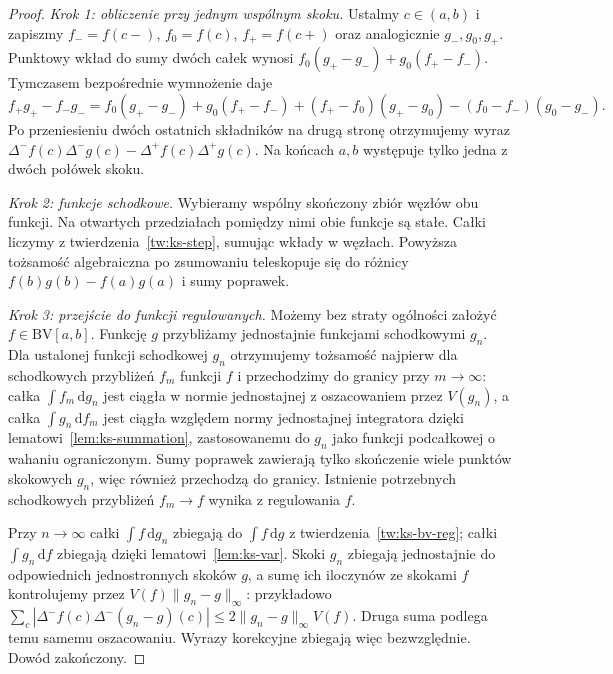 \documentclass[11pt,a4paper]{article}
\numberwithin{equation}{section}
\theoremstyle{plain}
\theoremstyle{definition}
\theoremstyle{remark}
\newcommand{\BV}{\mathrm{BV}}
\begin{document}
\begin{proof}
\emph{Krok 1: obliczenie przy jednym wspólnym skoku.} Ustalmy $c\in(a,b)$ i zapiszmy $f_-=f(c-)$, $f_0=f(c)$, $f_+=f(c+)$ oraz analogicznie $g_-,g_0,g_+$. Punktowy wkład do sumy dwóch całek wynosi $f_0(g_+-g_-)+g_0(f_+-f_-)$. Tymczasem bezpośrednie wymnożenie daje
\[
 f_+g_+-f_-g_-=f_0(g_+-g_-)+g_0(f_+-f_-)
 +(f_+-f_0)(g_+-g_0)-(f_0-f_-)(g_0-g_-).
\]
Po przeniesieniu dwóch ostatnich składników na drugą stronę otrzymujemy wyraz $\Delta^-f(c)\Delta^-g(c)-\Delta^+f(c)\Delta^+g(c)$. Na końcach $a,b$ występuje tylko jedna z dwóch połówek skoku.

\emph{Krok 2: funkcje schodkowe.} Wybieramy wspólny skończony zbiór węzłów obu funkcji. Na otwartych przedziałach pomiędzy nimi obie funkcje są stałe. Całki liczymy z twierdzenia~\ref{tw:ks-step}, sumując wkłady w węzłach. Powyższa tożsamość algebraiczna po zsumowaniu teleskopuje się do różnicy $f(b)g(b)-f(a)g(a)$ i sumy poprawek.

\emph{Krok 3: przejście do funkcji regulowanych.} Możemy bez straty ogólności założyć $f\in\BV[a,b]$. Funkcję $g$ przybliżamy jednostajnie funkcjami schodkowymi $g_n$. Dla ustalonej funkcji schodkowej $g_n$ otrzymujemy tożsamość najpierw dla schodkowych przybliżeń $f_m$ funkcji $f$ i przechodzimy do granicy przy $m\to\infty$: całka $\int f_m\,\mathrm dg_n$ jest ciągła w normie jednostajnej z oszacowaniem przez $V(g_n)$, a całka $\int g_n\,\mathrm df_m$ jest ciągła względem normy jednostajnej integratora dzięki lematowi~\ref{lem:ks-summation}, zastosowanemu do $g_n$ jako funkcji podcałkowej o wahaniu ograniczonym. Sumy poprawek zawierają tylko skończenie wiele punktów skokowych $g_n$, więc również przechodzą do granicy. Istnienie potrzebnych schodkowych przybliżeń $f_m\to f$ wynika z regulowania $f$.

Przy $n\to\infty$ całki $\int f\,\mathrm dg_n$ zbiegają do $\int f\,\mathrm dg$ z twierdzenia~\ref{tw:ks-bv-reg}; całki $\int g_n\,\mathrm df$ zbiegają dzięki lematowi~\ref{lem:ks-var}. Skoki $g_n$ zbiegają jednostajnie do odpowiednich jednostronnych skoków $g$, a sumę ich iloczynów ze skokami $f$ kontrolujemy przez $V(f)\|g_n-g\|_\infty$: przykładowo $\sum_c|\Delta^-f(c)\Delta^-(g_n-g)(c)|\le2\|g_n-g\|_\infty V(f)$. Druga suma podlega temu samemu oszacowaniu. Wyrazy korekcyjne zbiegają więc bezwzględnie. Dowód zakończony.
\end{proof}
\end{document}
